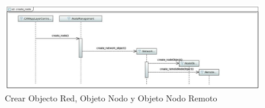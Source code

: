 \begin{figure}[h!]
 \centering
 \includegraphics[scale=0.4]{images/Secciones/AppendixA/create_node.JPG}
  \caption{Crear Objecto Red, Objeto Nodo y Objeto Nodo Remoto}
  \label{fig:ProtocolNMTConnectNet}
\end{figure}






















































































